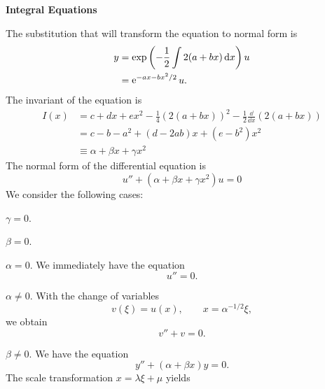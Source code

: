 {%
\begin{large}
  \noindent
  \textbf{Integral Equations}
\end{large}
















\begin{Solution}
  \label{solution y2abxycdxex2y=0}
  The substitution that will transform the equation to normal form is
  \begin{align*}
    y       &= \exp\left( -\frac{1}{2} \int 2(a + b x) \,\mathrm{d} x \right) u \\
    &= \mathop{\mathrm{e}}\nolimits^{-a x - b x^2 / 2} u.
  \end{align*}
  The invariant of the equation is
  \begin{align*}
    I(x)    &= c + d x + e x^2 - \frac{1}{4} (2(a+b x))^2 - \frac{1}{2}
    \frac{\dd}{\dd x} (2(a+b x)) \\
    &= c - b - a^2 + (d - 2 a b) x + (e - b^2) x^2 \\
    &\equiv \alpha + \beta x + \gamma x^2
  \end{align*}
  The normal form of the differential equation is
  \[
  u'' + (\alpha + \beta x + \gamma x^2) u = 0
  \]
  We consider the following cases:
  \begin{description}
  \item{$\gamma = 0$.}
    \begin{description}
    \item{$\beta = 0$.}
      \begin{description}
      \item{$\alpha = 0$.}
        We immediately have the equation
        \[
        u'' = 0.
        \]
      \item{$\alpha \neq 0$.}
        With the change of variables
        \[
        v(\xi) = u(x), \qquad x = \alpha^{-1/2} \xi,
        \]
        we obtain
        \[
        v'' + v = 0.
        \]
      \end{description}
    \item{$\beta \neq 0$.}
      We have the equation
      \[
      y'' + (\alpha + \beta x) y = 0.
      \]
      The scale transformation $x = \lambda  \xi + \mu$ yields

\end{description}
\end{description}
\end{Solution}}
